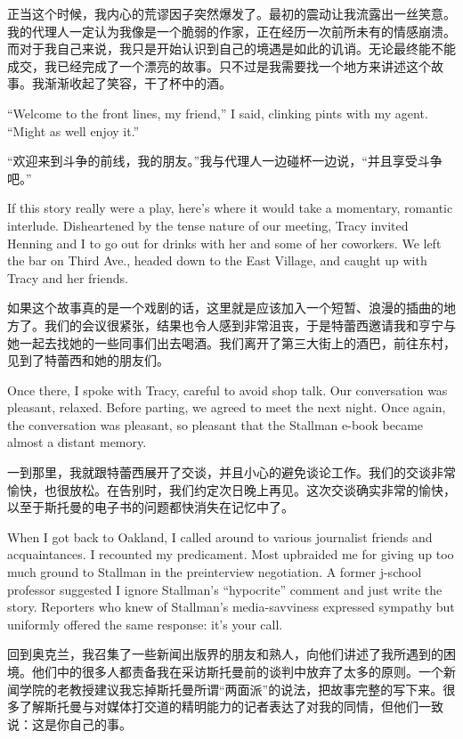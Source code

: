 \ifdefined\chs
正当这个时候，我内心的荒谬因子突然爆发了。最初的震动让我流露出一丝笑意。我的代理人一定认为我像是一个脆弱的作家，正在经历一次前所未有的情感崩溃。而对于我自己来说，我只是开始认识到自己的境遇是如此的讥诮。无论最终能不能成交，我已经完成了一个漂亮的故事。只不过是我需要找一个地方来讲述这个故事。我渐渐收起了笑容，干了杯中的酒。
\fi

\ifdefined\eng
``Welcome to the front lines, my friend,'' I said, clinking pints with my agent. ``Might as well enjoy it.''
\fi

\ifdefined\chs
“欢迎来到斗争的前线，我的朋友。”我与代理人一边碰杯一边说，“并且享受斗争吧。”
\fi

\ifdefined\eng
If this story really were a play, here's where it would take a momentary, romantic interlude. Disheartened by the tense nature of our meeting, Tracy invited Henning and I to go out for drinks with her and some of her coworkers. We left the bar on Third Ave., headed down to the East Village, and caught up with Tracy and her friends.
\fi

\ifdefined\chs
如果这个故事真的是一个戏剧的话，这里就是应该加入一个短暂、浪漫的插曲的地方了。我们的会议很紧张，结果也令人感到非常沮丧，于是特蕾西邀请我和亨宁与她一起去找她的一些同事们出去喝酒。我们离开了第三大街上的酒巴，前往东村，见到了特蕾西和她的朋友们。
\fi

\ifdefined\eng
Once there, I spoke with Tracy, careful to avoid shop talk. Our conversation was pleasant, relaxed. Before parting, we agreed to meet the next night. Once again, the conversation was pleasant, so pleasant that the Stallman e-book became almost a distant memory.
\fi

\ifdefined\chs
一到那里，我就跟特蕾西展开了交谈，并且小心的避免谈论工作。我们的交谈非常愉快，也很放松。在告别时，我们约定次日晚上再见。这次交谈确实非常的愉快，以至于斯托曼的电子书的问题都快消失在记忆中了。
\fi

\ifdefined\eng
When I got back to Oakland, I called around to various journalist friends and acquaintances. I recounted my predicament. Most upbraided me for giving up too much ground to Stallman in the preinterview negotiation. %
A former j-school professor suggested I ignore Stallman's ``hypocrite'' comment and just write the story. Reporters who knew of Stallman's media-savviness expressed sympathy but uniformly offered the same response: it's your call.
\fi

\ifdefined\chs
回到奥克兰，我召集了一些新闻出版界的朋友和熟人，向他们讲述了我所遇到的困境。他们中的很多人都责备我在采访斯托曼前的谈判中放弃了太多的原则。一个新闻学院的老教授建议我忘掉斯托曼所谓“两面派”的说法，把故事完整的写下来。很多了解斯托曼与对媒体打交道的精明能力的记者表达了对我的同情，但他们一致说：这是你自己的事。
\fi

